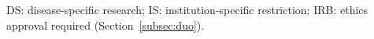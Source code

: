 \begin{table}[htbp]
	\begin{tablenote}
		DS: disease-specific research; IS: institution-specific restriction; IRB: ethics approval required (Section~\ref{subsec:duo}).
	\end{tablenote}
\end{table}
